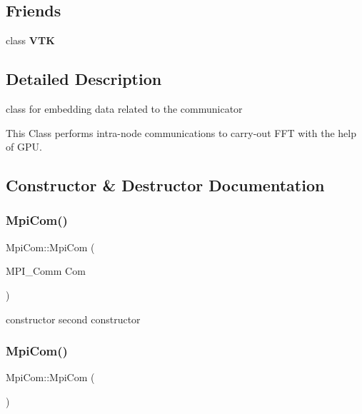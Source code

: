 \subsection*{Friends}
\begin{DoxyCompactItemize}
\item 
\mbox{\label{structMpiCom_abf858174faa5fb6573824cbcbddf7924}} 
class {\bfseries V\+TK}
\end{DoxyCompactItemize}


\subsection{Detailed Description}
class for embedding data related to the communicator 

This Class performs intra-\/node communications to carry-\/out F\+FT with the help of G\+PU. 

\subsection{Constructor \& Destructor Documentation}
\mbox{\label{structMpiCom_a5099477d534468bdaffed3bb75e31152}} 
\subsubsection{\texorpdfstring{Mpi\+Com()}{MpiCom()}\hspace{0.1cm}{\footnotesize\ttfamily [1/2]}}
{\footnotesize\ttfamily Mpi\+Com\+::\+Mpi\+Com (\begin{DoxyParamCaption}\item[{M\+P\+I\+\_\+\+Comm}]{Com }\end{DoxyParamCaption})}

constructor second constructor \mbox{\label{structMpiCom_a32daad0b1965c35cdf7485a565cd0d8c}} 
\subsubsection{\texorpdfstring{Mpi\+Com()}{MpiCom()}\hspace{0.1cm}{\footnotesize\ttfamily [2/2]}}
{\footnotesize\ttfamily Mpi\+Com\+::\+Mpi\+Com (\begin{DoxyParamCaption}{ }\end{DoxyParamCaption})\hspace{0.3cm}{\ttfamily [inline]}}

